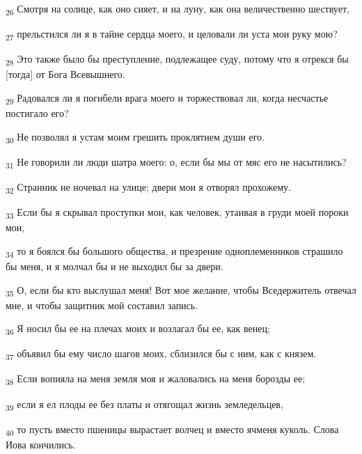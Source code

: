 \begin{tcolorbox}
\textsubscript{26} Смотря на солнце, как оно сияет, и на луну, как она величественно шествует,
\end{tcolorbox}
\begin{tcolorbox}
\textsubscript{27} прельстился ли я в тайне сердца моего, и целовали ли уста мои руку мою?
\end{tcolorbox}
\begin{tcolorbox}
\textsubscript{28} Это также было бы преступление, подлежащее суду, потому что я отрекся бы [тогда] от Бога Всевышнего.
\end{tcolorbox}
\begin{tcolorbox}
\textsubscript{29} Радовался ли я погибели врага моего и торжествовал ли, когда несчастье постигало его?
\end{tcolorbox}
\begin{tcolorbox}
\textsubscript{30} Не позволял я устам моим грешить проклятием души его.
\end{tcolorbox}
\begin{tcolorbox}
\textsubscript{31} Не говорили ли люди шатра моего: о, если бы мы от мяс его не насытились?
\end{tcolorbox}
\begin{tcolorbox}
\textsubscript{32} Странник не ночевал на улице; двери мои я отворял прохожему.
\end{tcolorbox}
\begin{tcolorbox}
\textsubscript{33} Если бы я скрывал проступки мои, как человек, утаивая в груди моей пороки мои,
\end{tcolorbox}
\begin{tcolorbox}
\textsubscript{34} то я боялся бы большого общества, и презрение одноплеменников страшило бы меня, и я молчал бы и не выходил бы за двери.
\end{tcolorbox}
\begin{tcolorbox}
\textsubscript{35} О, если бы кто выслушал меня! Вот мое желание, чтобы Вседержитель отвечал мне, и чтобы защитник мой составил запись.
\end{tcolorbox}
\begin{tcolorbox}
\textsubscript{36} Я носил бы ее на плечах моих и возлагал бы ее, как венец;
\end{tcolorbox}
\begin{tcolorbox}
\textsubscript{37} объявил бы ему число шагов моих, сблизился бы с ним, как с князем.
\end{tcolorbox}
\begin{tcolorbox}
\textsubscript{38} Если вопияла на меня земля моя и жаловались на меня борозды ее;
\end{tcolorbox}
\begin{tcolorbox}
\textsubscript{39} если я ел плоды ее без платы и отягощал жизнь земледельцев,
\end{tcolorbox}
\begin{tcolorbox}
\textsubscript{40} то пусть вместо пшеницы вырастает волчец и вместо ячменя куколь. Слова Иова кончились.
\end{tcolorbox}
